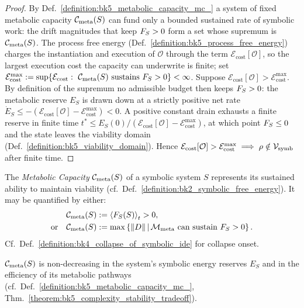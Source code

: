 \begin{proof}
\label{proof:bk5_fixed_metabolic_capacity}
\leavevmode
By Def.~\ref{definition:bk5_metabolic_capacity_mc_} a system of fixed metabolic capacity $\mathcal{C}_{\text{meta}}(S)$ can fund only a bounded sustained rate of symbolic work: the drift magnitudes that keep $F_S>0$ form a set whose supremum is $\mathcal{C}_{\text{meta}}(S)$. The process free energy (Def.~\ref{definition:bk5_process_free_energy}) charges the instantiation and execution of $\mathcal{O}$ through the term $\mathcal{E}_{\text{cost}}[\mathcal{O}]$, so the largest execution cost the capacity can underwrite is finite; set $\mathcal{E}_{\text{cost}}^{\max}:=\sup\{\mathcal{E}_{\text{cost}}:\ \MC(S)\text{ sustains }\freeenergy>0\}<\infty$. Suppose $\mathcal{E}_{\text{cost}}[\mathcal{O}]>\mathcal{E}_{\text{cost}}^{\max}$. By definition of the supremum no admissible budget then keeps $F_S>0$: the metabolic reserve $E_S$ is drawn down at a strictly positive net rate $\dot E_S\le -(\mathcal{E}_{\text{cost}}[\mathcal{O}]-\mathcal{E}_{\text{cost}}^{\max})<0$. A positive constant drain exhausts a finite reserve in finite time $t^{\ast}\le E_S(0)/(\mathcal{E}_{\text{cost}}[\mathcal{O}]-\mathcal{E}_{\text{cost}}^{\max})$, at which point $F_S\le 0$ and the state leaves the viability domain (Def.~\ref{definition:bk5_viability_domain}). Hence $\mathcal{E}_{\text{cost}}[\mathcal{O}]>\mathcal{E}_{\text{cost}}^{\max}\implies \rho\notin\mathcal{V}_{\mathrm{symb}}$ after finite time.
\end{proof}
\begin{definition} \label{definition:bk5_metabolic_capacity_mc_}

The \emph{Metabolic Capacity} $\mathcal{C}_{\text{meta}}(S)$ of a symbolic system $S$ represents its sustained ability to maintain viability (cf.~Def.~\ref{definition:bk2_symbolic_free_energy}). It may be quantified by either:
\[
\begin{aligned}
\mathcal{C}_{\text{meta}}(S) &:= \left\langle F_S(S) \right\rangle_t > 0, \\
\text{or}\quad \mathcal{C}_{\text{meta}}(S) &:= \max \left\{ \|D\| \,\middle|\, \mathcal{M}_{\mathrm{meta}}
\text{ can sustain } F_S > 0 \right\}.
\end{aligned}
\]
Cf.~Def.~\ref{definition:bk4_collapse_of_symbolic_ide} for collapse onset.
\end{definition}
\begin{proposition}
\label{proposition:bk5_metabolic_capacity_non_decreasing}
$\mathcal{C}_{\text{meta}}(S)$ is non-decreasing in the system's symbolic energy reserves $E_S$ and in the efficiency of its metabolic pathways (cf.~Def.~\ref{definition:bk5_metabolic_capacity_mc_}, Thm.~\ref{theorem:bk5_complexity_stability_tradeoff}).
\end{proposition}
